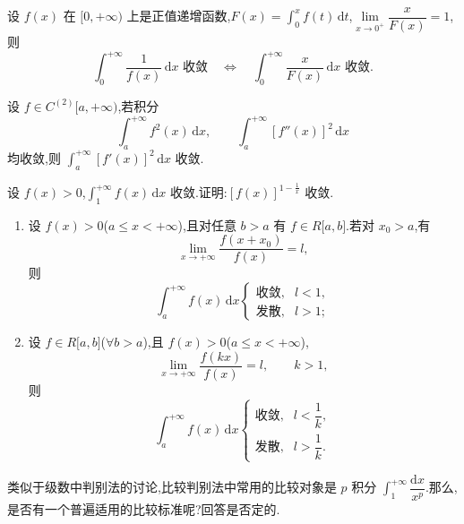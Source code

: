\documentclass[../../数学分析培优讲义.tex]{subfiles}
\begin{document}
\begin{example}
设 $f(x)$ 在 $\lbrack 0,+\infty)$ 上是正值递增函数,$\displaystyle F(x)=\int_0^xf(t)\,\mathrm{d}t$,$\displaystyle\lim\limits_{x\to0^+}\dfrac{x}{F(x)}=1$,则
\[
    \int_0^{+\infty}\dfrac{1}{f(x)}\,\mathrm{d}x\text{ 收敛}
    \quad\Longleftrightarrow\quad
    \int_0^{+\infty}\dfrac{x}{F(x)}\,\mathrm{d}x\text{ 收敛}.
\]
\end{example}
\exampleblank

\begin{example}
设 $f\in C^{(2)}\lbrack a,+\infty)$,若积分
\[
    \int_a^{+\infty}f^2(x)\,\mathrm{d}x,
    \qquad
    \int_a^{+\infty}[f''(x)]^2\,\mathrm{d}x
\]
均收敛,则 $\displaystyle\int_a^{+\infty}[f'(x)]^2\,\mathrm{d}x$ 收敛.
\end{example}
\exampleblank

\begin{example}
设 $f(x)>0$,$\displaystyle\int_1^{+\infty}f(x)\,\mathrm{d}x$ 收敛.证明:$[f(x)]^{1-\frac{1}{x}}$ 收敛.
\end{example}
\exampleblank

\begin{example}
\begin{enumerate}[label=(\arabic*)]
    \item 设 $f(x)>0$($a\leq x<+\infty$),且对任意 $b>a$ 有 $f\in R\lbrack a,b\rbrack$.若对 $x_0>a$,有
    \[
        \lim\limits_{x\to+\infty}\dfrac{f(x+x_0)}{f(x)}=l,
    \]
    则
    \[
        \int_a^{+\infty}f(x)\,\mathrm{d}x
        \begin{cases}
            \text{收敛},&l<1,\\
            \text{发散},&l>1;
        \end{cases}
    \]
    \item 设 $f\in R\lbrack a,b\rbrack$($\forall b>a$),且 $f(x)>0$($a\leq x<+\infty$),
    \[
        \lim\limits_{x\to+\infty}\dfrac{f(kx)}{f(x)}=l,
        \qquad k>1,
    \]
    则
    \[
        \int_a^{+\infty}f(x)\,\mathrm{d}x
        \begin{cases}
            \text{收敛},&l<\dfrac{1}{k},\\
            \text{发散},&l>\dfrac{1}{k}.
        \end{cases}
    \]
\end{enumerate}
\end{example}
\exampleblank

类似于级数中判别法的讨论,比较判别法中常用的比较对象是 $p$ 积分 $\displaystyle\int_1^{+\infty}\dfrac{\mathrm{d}x}{x^p}$.那么,是否有一个普遍适用的比较标准呢?回答是否定的.
\end{document}
